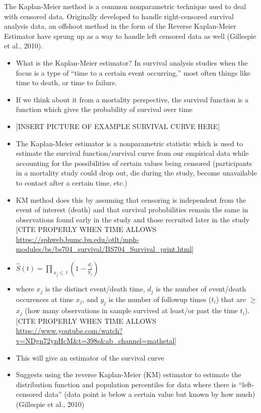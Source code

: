 \documentclass[12pt, twoside]{amherstthesis}
\begin{document}
The Kaplan-Meier method is a common nonparametric technique used to deal with censored data. Originally developed to handle right-censored survival analysis data, an offshoot method in the form of the Reverse Kaplan-Meier Estimator have sprung up as a way to handle left censored data as well (Gillespie et al., 2010).
\begin{itemize}
\item
  What is the Kaplan-Meier estimator? In survival analysis studies when the focus is a type of ``time to a certain event occurring,'' most often things like time to death, or time to failure.
\item
  If we think about it from a mortality perspective, the survival function is a function which gives the probability of survival over time
\item
  {[}INSERT PICTURE OF EXAMPLE SURVIVAL CURVE HERE{]}
\item
  The Kaplan-Meier estimator is a nonparametric statistic which is used to estimate the survival function/survival curve from our empirical data while accounting for the possibilities of certain values being censored (participants in a mortality study could drop out, die during the study, become unavailable to contact after a certain time, etc.)
\item
  KM method does this by assuming that censoring is independent from the event of interest (death) and that survival probabilities remain the same in observations found early in the study and those recruited later in the study {[}CITE PROPERLY WHEN TIME ALLOWS \url{https://sphweb.bumc.bu.edu/otlt/mph-modules/bs/bs704_survival/BS704_Survival_print.html}{]}
\item
  \(\hat{S}(t) = \prod_{\ x_j \le \ t }(1-\frac{d_j}{y_j})\)
\item
  where \(x_j\) is the distinct event/death time, \(d_j\) is the number of event/death occurences at time \(x_j\), and \(y_j\) is the number of followup times (\(t_i\)) that are \(\ge\) \(x_j\) (how many observations in sample survived at least/or past the time \(t_i\)). {[}CITE PROPERLY WHEN TIME ALLOWS \url{https://www.youtube.com/watch?v=NDgn72ynHcM\&t=398s\&ab_channel=mathetal}{]}
\item
  This will give an estimator of the survival curve
\item
  Suggests using the reverse Kaplan-Meier (KM) estimator to estimate the distribution function and population percentiles for data where there is ``left-censored data'' (data point is below a certain value but known by how much) (Gillespie et al., 2010)

\end{itemize}
\end{document}
